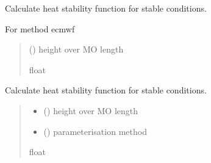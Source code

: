 \documentclass[letterpaper,10pt,english]{sphinxmanual}
\begin{document}
\begin{fulllineitems}
\label{\detokenize{users_guide:AirSeaFluxCode.flux_subs.stratification.psi_ecmwf}}
\pysigstartsignatures
{}
\pysigstopsignatures
\sphinxAtStartPar
Calculate heat stability function for stable conditions.

\sphinxAtStartPar
For method ecmwf
\begin{quote}\begin{description}
\sphinxAtStartPar
{} () \textendash{} height over MO length

\sphinxAtStartPar
{}

\sphinxAtStartPar
float

\end{description}\end{quote}

\end{fulllineitems}


\begin{fulllineitems}
\label{\detokenize{users_guide:AirSeaFluxCode.flux_subs.stratification.psi_stab}}
\pysigstartsignatures
{}
\pysigstopsignatures
\sphinxAtStartPar
Calculate heat stability function for stable conditions.
\begin{quote}\begin{description}
\begin{itemize}
\item {} 
\sphinxAtStartPar
{} () \textendash{} height over MO length

\item {} 
\sphinxAtStartPar
{} () \textendash{} parameterisation method

\end{itemize}

\sphinxAtStartPar
{}

\sphinxAtStartPar
float

\end{description}\end{quote}

\end{fulllineitems}
\end{document}
